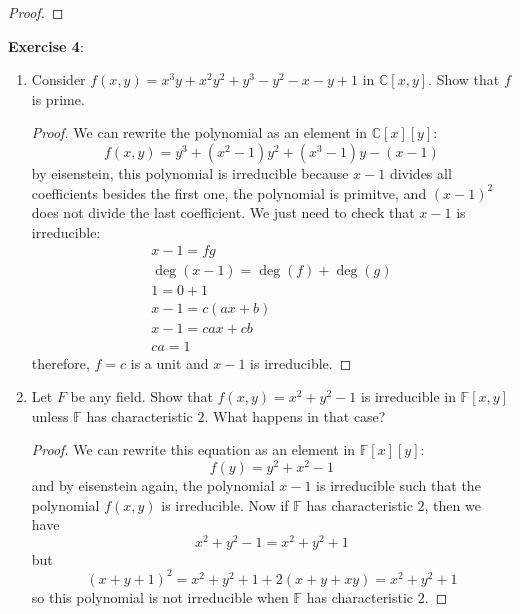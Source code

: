 \documentclass{article}
\begin{document}
\begin{proof}
	
\end{proof}

\textbf{Exercise 4}: 
\begin{enumerate}
	\item Consider $f(x,y) = x^{3}y + x^{2}y^{2} + y^{3} - y^{2} - x - y + 1$ in $\mathbb{C}[x,y]$. Show that $f$ is prime.
		\begin{proof}
			We can rewrite the polynomial as an element in $\mathbb{C}[x][y]$:
			\begin{equation*}
				f(x,y) = y^{3} + (x^{2} - 1)y^{2} + (x^{3} - 1)y - (x - 1)
			\end{equation*}
			by eisenstein, this polynomial is irreducible because $x - 1$ divides all coefficients besides the first one, the polynomial is primitve, and $(x - 1)^{2}$ does not divide the last coefficient. We just need to check that $x - 1$ is irreducible:
			\begin{align*}
				x - 1 = fg \\
				\deg(x - 1) = \deg(f) + \deg(g) \\
				1 = 0 + 1 \\
				x - 1 = c(ax + b) \\
				x - 1 = cax + cb \\
				ca = 1
			\end{align*}
			therefore, $f = c$ is a unit and $x - 1$ is irreducible.
		\end{proof}

	\item Let $F$ be any field. Show that $f(x,y) = x^{2} + y^{2} - 1$ is irreducible in $\mathbb{F}[x,y]$ unless $\mathbb{F}$ has characteristic $2$. What happens in that case?
		\begin{proof}
			We can rewrite this equation as an element in $\mathbb{F}[x][y]$:
			\begin{equation*}
				f(y) = y^{2} + x^{2} -1 
			\end{equation*}
			and by eisenstein again, the polynomial $x - 1$ is irreducible such that the polynomial $f(x, y)$ is irreducible. Now if $\mathbb{F}$ has characteristic $2$, then we have 
			\begin{equation*}
				x^{2} + y^{2} - 1 = x^{2} + y^{2} + 1
			\end{equation*}
			but 
			\begin{equation*}
				(x + y + 1)^{2} = x^{2} + y^{2} + 1 + 2(x + y + xy) = x^{2} + y^{2} + 1
			\end{equation*}
			so this polynomial is not irreducible when $\mathbb{F}$ has characteristic $2$.
		\end{proof}
\end{enumerate}
\end{document}
